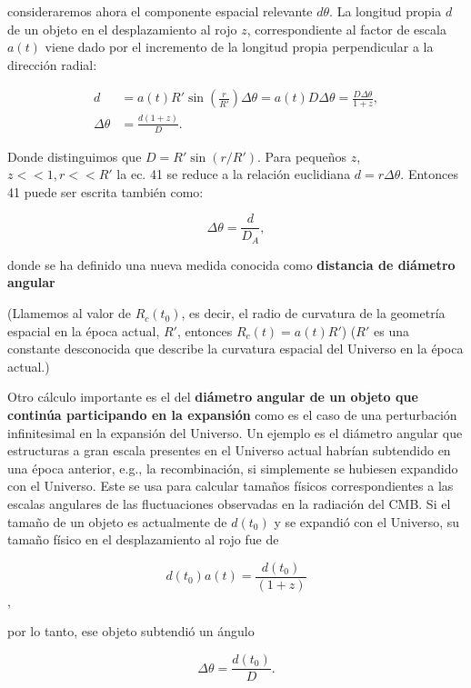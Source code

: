 \documentclass{article}
\begin{document}
  consideraremos ahora el componente espacial relevante $d\theta$. La longitud propia $d$ de un objeto en el desplazamiento al rojo $z$, correspondiente al factor de escala $a(t)$ viene dado por el incremento de la longitud propia perpendicular a la dirección radial:
  
  \begin{align}
      d & = a(t) R' \sin \left(\frac{r}{R'} \right) \Delta \theta = a(t) D \Delta \theta = \frac{D \Delta \theta}{1+z}, \\
      \Delta \theta & = \frac{d(1+z)}{D}.
  \end{align}

Donde distinguimos que $D = R' \sin(r/R')$. Para pequeños $z$, $z << 1, r <<R'$ la ec. 41 se reduce a la relación euclidiana $d = r \Delta \theta$. Entonces 41 puede ser escrita también como:

    \begin{equation}
        \Delta \theta = \frac{d}{D_A},
    \end{equation}

donde se ha definido una nueva medida conocida como {\bf{distancia de diámetro angular}}

(Llamemos al valor de $ R_c (t_0) $, es decir, el radio de curvatura de la geometría espacial en la época actual, $ R '$, entonces $R_c(t)= a(t) R'$)
($R'$ es una constante desconocida que describe la curvatura espacial del Universo en la época actual.)

Otro cálculo importante es el del {\bf{diámetro angular de un objeto que continúa participando en la expansión}} como es el caso de una perturbación infinitesimal en la expansión del Universo. Un ejemplo es el diámetro angular que estructuras a gran escala presentes en el Universo actual habrían subtendido en una época anterior, e.g., la recombinación, si simplemente se hubiesen expandido con el Universo. Este se usa para calcular tamaños físicos correspondientes a las escalas angulares de las fluctuaciones observadas en la radiación del CMB. Si el tamaño de un objeto es actualmente de $d(t_0)$ y se expandió con el Universo, su tamaño físico en el desplazamiento al rojo fue de

    $$d(t_0) a(t)=  \frac{d(t_0)}{(1+z)}$$,

por lo tanto, ese objeto subtendió un ángulo

    \begin{equation}
        \Delta \theta = \frac{d(t_0)}{D}.
    \end{equation}
\end{document}
